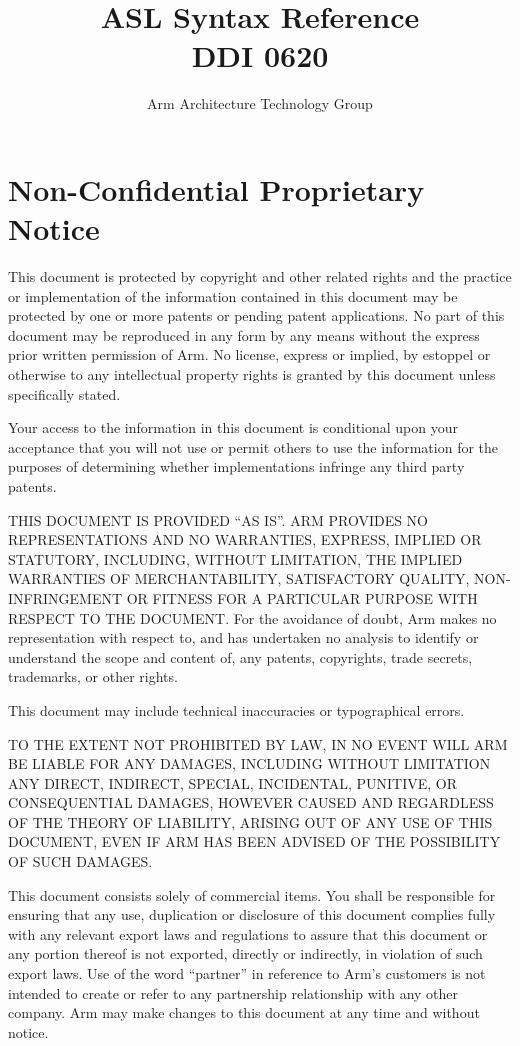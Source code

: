 \documentclass{book}
\author{Arm Architecture Technology Group}
\title{ASL Syntax Reference \\
       DDI 0620}
\begin{document}
\maketitle

\tableofcontents{}

\chapter{Non-Confidential Proprietary Notice}
 
This document is protected by copyright and other related rights and the
practice or implementation of the information contained in this document may be
protected by one or more patents or pending patent applications. No part of
this document may be reproduced in any form by any means without the express
prior written permission of Arm. No license, express or implied, by estoppel or
otherwise to any intellectual property rights is granted by this document
unless specifically stated.
               
Your access to the information in this document is conditional upon your
acceptance that you will not use or permit others to use the information for
the purposes of determining whether implementations infringe any third party
patents.
 
THIS DOCUMENT IS PROVIDED “AS IS”. ARM PROVIDES NO REPRESENTATIONS AND NO
WARRANTIES, EXPRESS, IMPLIED OR STATUTORY, INCLUDING, WITHOUT LIMITATION, THE
IMPLIED WARRANTIES OF MERCHANTABILITY, SATISFACTORY QUALITY, NON-INFRINGEMENT
OR FITNESS FOR A PARTICULAR PURPOSE WITH RESPECT TO THE DOCUMENT. For the
avoidance of doubt, Arm makes no representation with respect to, and has
undertaken no analysis to identify or understand the scope and content of, any
patents, copyrights, trade secrets, trademarks, or other rights. 
 
This document may include technical inaccuracies or typographical errors.
 
TO THE EXTENT NOT PROHIBITED BY LAW, IN NO EVENT WILL ARM BE LIABLE FOR ANY
DAMAGES, INCLUDING WITHOUT LIMITATION ANY DIRECT, INDIRECT, SPECIAL,
INCIDENTAL, PUNITIVE, OR CONSEQUENTIAL DAMAGES, HOWEVER CAUSED AND REGARDLESS
OF THE THEORY OF LIABILITY, ARISING OUT OF ANY USE OF THIS DOCUMENT, EVEN IF
ARM HAS BEEN ADVISED OF THE POSSIBILITY OF SUCH DAMAGES.
 
This document consists solely of commercial items. You shall be responsible for
ensuring that any use, duplication or disclosure of this document complies
fully with any relevant export laws and regulations to assure that this
document or any portion thereof is not exported, directly or indirectly, in
violation of such export laws. Use of the word “partner” in reference to Arm’s
customers is not intended to create or refer to any partnership relationship
with any other company. Arm may make changes to this document at any time and
without notice.
 
\end{document}
